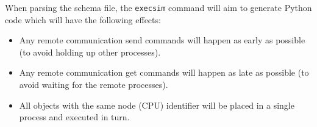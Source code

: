 \documentclass{article}
\begin{document}
When parsing the schema file, the \texttt{execsim} command will aim to
generate Python code which will have the following effects:
\begin{itemize}
\item Any remote communication send commands will happen as early as
  possible (to avoid holding up other processes).
\item Any remote communication get commands will happen as late as
  possible (to avoid waiting for the remote processes).
\item All objects with the same node (CPU) identifier will be placed
  in a single process and executed in turn.
\end{itemize}

\pagebreak
%

\printindex
\end{document}
